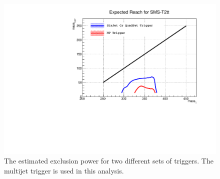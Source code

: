 \begin{figure}[htbp] 
\centering
\includegraphics[angle=0,scale=0.5]{figs/SMST2tt_20121114.pdf}
\caption{The estimated exclusion power for two different sets of triggers. The multijet trigger is used in this analysis.}
\label{fig:trgs_exclusion_powers}
\end{figure}
